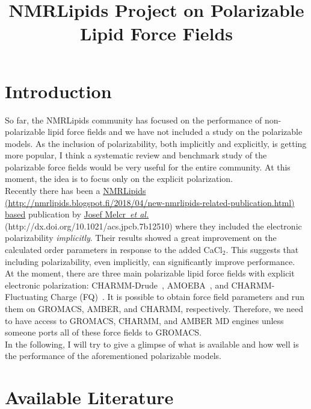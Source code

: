 \documentclass[12pt]{article}
\title{NMRLipids Project on Polarizable Lipid Force Fields}
\begin{document}
\maketitle

\section{Introduction}
So far, the NMRLipids community has focused on the performance of non-polarizable lipid force fields and we have not included a study on the polarizable
models. As the inclusion of polarizability, both implicitly and explicitly, is getting more popular, I think a systematic review and benchmark study of the polarizable force fields would be very useful for the entire community. At this moment, the idea is to focus only on the explicit polarization.\\

Recently there has been a \underline{NMRLipids (http://nmrlipids.blogspot.fi/2018/04/new-nmrlipids-related-publication.html) based} publication by \underline{Josef Melcr~\textit{et al.}} (http://dx.doi.org/10.1021/acs.jpcb.7b12510) where they included the electronic polarizability \textit{implicitly}. Their results showed a great improvement on the calculated order parameters in response to the added CaCl$_{2}$. This suggests that including polarizability, even implicitly, can significantly improve performance.\\

At the moment, there are three main polarizable lipid force fields with explicit electronic polarization: CHARMM-Drude~\cite{li2017drude}, AMOEBA~\cite{chu2018anionicpolarizable,chu2018polarizable}, and CHARMM-Fluctuating Charge (FQ)~\cite{lucas2012charge}. It is possible to obtain force field parameters and run them on GROMACS, AMBER, and CHARMM, respectively. Therefore, we need to have access to GROMACS, CHARMM, and AMBER MD engines unless someone ports all of these force fields to GROMACS.\\

In the following, I will try to give a glimpse of what is available and how well
is the performance of the aforementioned polarizable models. \\

\section{Available Literature}
\end{document}
